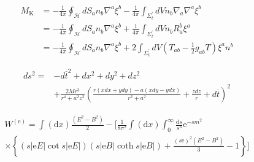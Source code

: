\documentclass[11pt,a4paper]{book}
\begin{document}
\begin{equation}
    \left.\begin{aligned} M _ { \mathrm { K } } & = - \frac { 1 } { 4 \pi } \oint _ { \mathcal { H } } d S _ { a } n _ { b } \nabla ^ { a } \xi ^ { b } - \frac { 1 } { 4 \pi } \int _ { \Sigma _ { t } ^ { \prime } } d V n _ { b } \nabla _ { a } \nabla ^ { a } \xi ^ { b } \\ & = - \frac { 1 } { 4 \pi } \oint _ { \mathcal { H } } d S _ { a } n _ { b } \nabla ^ { a } \xi ^ { b } + \frac { 1 } { 4 \pi } \int _ { \Sigma _ { t } ^ { \prime } } d V n _ { b } R _ { a } ^ { b } \xi ^ { a } \\ & = - \frac { 1 } { 4 \pi } \oint _ { \mathcal { H } } d S _ { a } n _ { b } \nabla ^ { a } \xi ^ { b } + 2 \int _ { \Sigma _ { t } ^ { \prime } } d V \left( T _ { a b } - \frac { 1 } { 2 } g _ { a b } T \right) \xi ^ { a } n ^ { b } \end{aligned} \right.
\end{equation}
	
	
\begin{equation}
\left.\begin{aligned} d s ^ { 2 } = & - d \overline { t } ^ { 2 } + d x ^ { 2 } + d y ^ { 2 } + d z ^ { 2 } \\ & + \frac { 2 M r ^ { 3 } } { r ^ { 4 } + a ^ { 2 } z ^ { 2 } } \left( \frac { r ( x d x + y d y ) - a ( x d y - y d x ) } { r ^ { 2 } + a ^ { 2 } } + \frac { z d z } { r } + d \overline { t } \right) ^ { 2 } \end{aligned} \right.    
\end{equation}


\begin{equation}
    \left. \begin{array} { c } { W ^ { ( \mathrm { e } ) } = \int ( \mathrm { d } x ) \frac { \left( E ^ { 2 } - B ^ { 2 } \right) } { 2 } - [ \frac { 1 } { 8 \pi ^ { 2 } } \int ( \mathrm { d } x ) \int _ { 0 } ^ { \infty } \frac { \mathrm { d } s } { s ^ { 3 } } \mathrm { e } ^ { - s m ^ { 2 } } } \\ { \times \left\{ ( s | \mathrm { e } E | \cot s | \mathrm { e } E | ) ( s | \mathrm { e } B | \operatorname { coth } s | \mathrm { e } B | ) + \frac { ( s \mathrm { e } ) ^ { 2 } \left( E ^ { 2 } - B ^ { 2 } \right) } { 3 } - 1 \right\} ] } \end{array} \right.
\end{equation}











\end{document}
